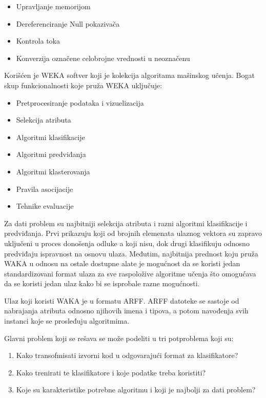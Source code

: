 \documentclass[a4paper]{article}
\theoremstyle{definition}
\begin{document}
{\begin{itemize}
\item Upravljanje memorijom

\item Dereferenciranje Null pokazivača

\item Kontrola toka

\item Konverzija označene celobrojne vrednosti u neoznačenu
\end{itemize}


Korišćen je WEKA softver koji je kolekcija algoritama mašinskog učenja.
Bogat skup funkcionalnosti koje pruža WEKA uključuje:
\begin{itemize}
\item Pretprocesiranje podataka i vizuelizacija
\item Selekcija atributa
\item Algoritmi klasifikacije
\item Algoritmi predviđanja
\item Algoritmi klasterovanja
\item Pravila asocijacije
\item Tehnike evaluacije
\end{itemize}


Za dati problem su najbitniji selekcija atributa i razni algoritmi klasifikacije i predviđanja.
Prvi prikazuju koji od brojnih elemenata ulaznog vektora su zapravo uključeni u proces donošenja odluke a koji nisu, dok
drugi klasifikuju odnosno predviđaju ispravnost na osnovu ulaza.
Međutim, najbitnija prednost koju pruža WAKA u odnosu na ostale dostupne alate je mogućnost da se koristi
jedan standardizovani format ulaza za sve raspoložive algoritme učenja što omogućava da se koristi jedan ulaz kako bi se isprobale
razne mogućnosti.

Ulaz koji koristi WAKA je u formatu ARFF.
ARFF datoteke se sastoje od nabrajanja atributa odnosno njihovih imena i tipova, a potom navođenja svih instanci koje se prosleđuju algoritmima.

Glavni problem koji se rešava se može podeliti u tri potproblema koji su:
\begin{enumerate}
\item Kako transofmisati izvorni kod u odgovarajući format za klasifikatore?
\item Kako trenirati te klasifikatore i koje podatke treba koristiti?
\item Koje su karakteristike potrebne algoritmu i koji je najbolji za dati problem?
\end{enumerate}



}
\end{document}
